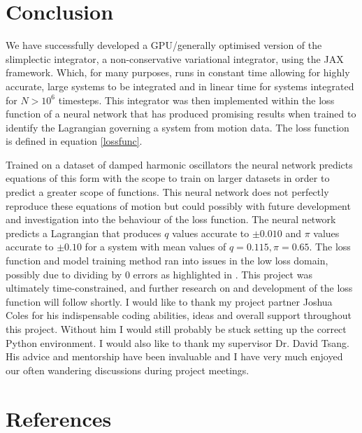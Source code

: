 \documentclass[10pt]{iopart}
\begin{document}
\section{Conclusion}
We have successfully developed a GPU/generally optimised version of the slimplectic integrator, a non-conservative variational integrator, using the JAX framework. Which, for many purposes, runs in constant time allowing for highly accurate, large systems to be integrated and in linear time for systems integrated for $N>10^6$ timesteps. This integrator was then implemented within the loss function of a neural network that has produced promising results when trained to identify the Lagrangian governing a system from motion data. The loss function is defined in equation \ref{lossfunc}. 

Trained on a dataset of damped harmonic oscillators the neural network predicts equations of this form with the scope to train on larger datasets in order to predict a greater scope of functions. This neural network does not perfectly reproduce these equations of motion but could possibly with future development and investigation into the behaviour of the loss function. The neural network predicts a Lagrangian that produces $q$ values accurate to $\pm 0.010$ and $\pi$ values accurate to $\pm 0.10$ for a system with mean values of $q=0.115, \pi = 0.65$. The loss function and model training method ran into issues in the low loss domain, possibly due to dividing by 0 errors as highlighted in . This project was ultimately time-constrained, and further research on and development of the loss function will follow shortly. 
\ack
I would like to thank my project partner Joshua Coles for his indispensable coding abilities, ideas and overall support throughout this project. Without him I would still probably be stuck setting up the correct Python environment. I would also like to thank my supervisor Dr. David Tsang. His advice and mentorship have been invaluable and I have very much enjoyed our often wandering discussions during project meetings. 
\section*{References}


\end{document}
